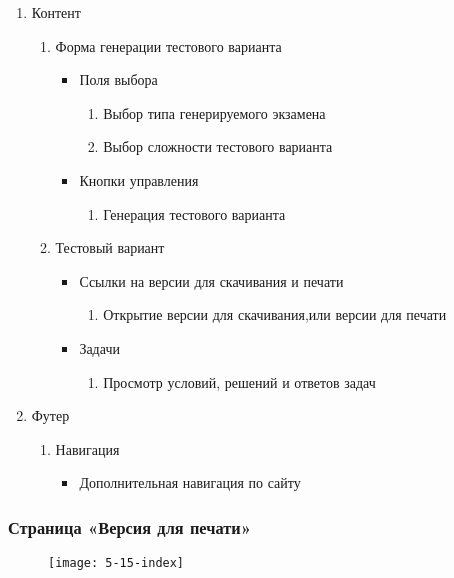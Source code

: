 \begin{enumerate}
	\item Контент
	\begin{enumerate}
		\item Форма генерации тестового варианта
		\begin{itemize}
		\item Поля выбора
		\begin{enumerate}
			\item Выбор типа генерируемого экзамена
			\item Выбор сложности тестового варианта
		\end{enumerate}
		\item Кнопки управления
		\begin{enumerate}
			\item Генерация тестового варианта
		\end{enumerate}
		\end{itemize}

		\item Тестовый вариант
		\begin{itemize}
		\item Ссылки на версии для скачивания и печати
		\begin{enumerate}
			\item Открытие версии для скачивания,или версии для печати
		\end{enumerate}
		\item Задачи
		\begin{enumerate}
			\item Просмотр условий, решений и ответов задач
		\end{enumerate}
		\end{itemize}
	\end{enumerate}

	\item Футер
	\begin{enumerate}
		\item Навигация
		\begin{itemize}
			\item Дополнительная навигация по сайту
		\end{itemize}
	\end{enumerate}
\end{enumerate}


\subsubsection{Страница «Версия для печати»}
\begin{figure}[H]
	\texttt{[image: 5-15-index]}
\end{figure}
